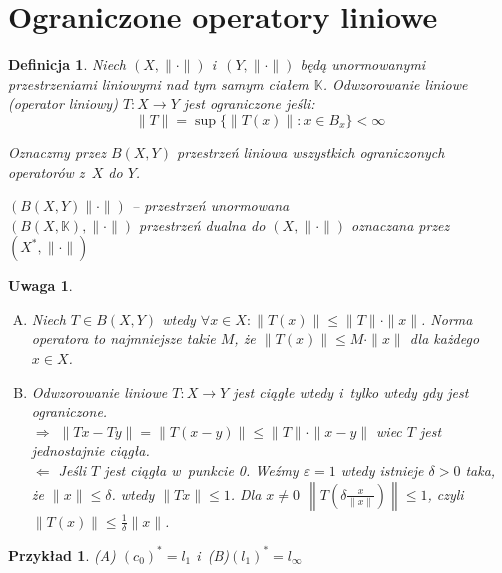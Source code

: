 \documentclass[11pt]{mwrep}
\renewcommand{\[}{\begin{equation}}
\renewcommand{\]}{\end{equation}}
\newcommand{\K}{\ensuremath{\mathbb{K}}}
\newcommand{\norm}{\|\cdot\|}
\newtheorem{uwaga}[subsection]{Uwaga}
\newtheorem{de}[subsection]{Definicja}
\newtheorem{ex}[subsection]{Przykład}
\newcounter{numer}
\begin{document}
\section{Ograniczone operatory liniowe}
\begin{de}
Niech $(X,\norm)$ i~$(Y,\norm)$ będą unormowanymi przestrzeniami liniowymi nad tym samym ciałem \K.
Odwzorowanie liniowe (operator liniowy) $T\colon X \to Y$ jest ograniczone jeśli:
$$\| T\| = \sup \{\|T(x)\|\colon x \in B_x\} < \infty$$

Oznaczmy przez $B(X,Y)$ przestrzeń liniowa wszystkich ograniczonych operatorów z~$X$ do $Y$.

$(B(X,Y) \norm)$ -- przestrzeń unormowana \\
$(B(X,\K), \norm)$ przestrzeń dualna do $(X,\norm)$ oznaczana przez $(X^*,\norm)$
\end{de}
\begin{uwaga}
	\begin{enumerate}[(A)]
		\item Niech $T\in B(X,Y)$ wtedy $\forall x\in X: \|T(x)\| \le \|T\| \cdot \|x\|$. 
			Norma operatora to najmniejsze takie $M$, że $\|T(x)\| \le M \cdot \|x\|$ dla każdego $x\in X$.
		\item Odwzorowanie liniowe $T\colon X \to Y$ jest ciągłe wtedy i~tylko wtedy gdy jest ograniczone.\\
			$\Rightarrow$ $\|Tx-Ty\| = \|T(x-y)\| \le \|T\| \cdot \|x - y\|$ wiec $T$ jest jednostajnie ciągła.\\
			$\Leftarrow$ Jeśli $T$ jest ciągła w~punkcie 0. Weźmy $\varepsilon=1$ wtedy istnieje $\delta>0$ taka, że $\|x\|\le \delta$.
			wtedy $\|Tx\|\le 1$.
			Dla $x\not =  0$ $\left\|T\left( \delta \frac{x}{\|x\|} \right)\right\|\le 1$, czyli $\|T(x)\|\le \frac{1}{\delta}\|x\|$.

	\end{enumerate}
\end{uwaga}
\begin{ex}	
	\textup{(A)} $(c_0)^* = l_1$ i~\textup{(B)}$(l_1)^* = l_\infty$
\end{ex}
\end{document}
